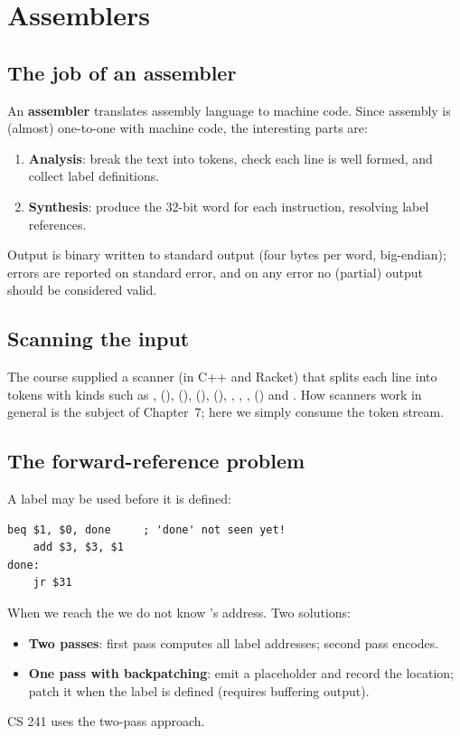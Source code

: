\chapter{Assemblers}

\section{The job of an assembler}

An \textbf{assembler} translates assembly language to machine code. Since assembly is (almost)
one-to-one with machine code, the interesting parts are:
\begin{enumerate}
  \item \textbf{Analysis}: break the text into tokens, check each line is well formed, and
        collect label definitions.
  \item \textbf{Synthesis}: produce the 32-bit word for each instruction, resolving label
        references.
\end{enumerate}
Output is binary written to standard output (four bytes per word, big-endian); errors are
reported on standard error, and on any error no (partial) output should be considered valid.

\section{Scanning the input}

The course supplied a scanner (in C++ and Racket) that splits each line into tokens with
kinds such as ,  (),  (),
 (),  (), , ,
,  () and . How scanners work in general is
the subject of Chapter~7; here we simply consume the token stream.

\section{The forward-reference problem}

A label may be used before it is defined:
\begin{lstlisting}[style=mips]
    beq $1, $0, done     ; 'done' not seen yet!
    add $3, $3, $1
done:
    jr $31
\end{lstlisting}
When we reach the  we do not know 's address. Two solutions:
\begin{itemize}
  \item \textbf{Two passes}: first pass computes all label addresses; second pass encodes.
  \item \textbf{One pass with backpatching}: emit a placeholder and record the location; patch
        it when the label is defined (requires buffering output).
\end{itemize}
CS 241 uses the two-pass approach.

